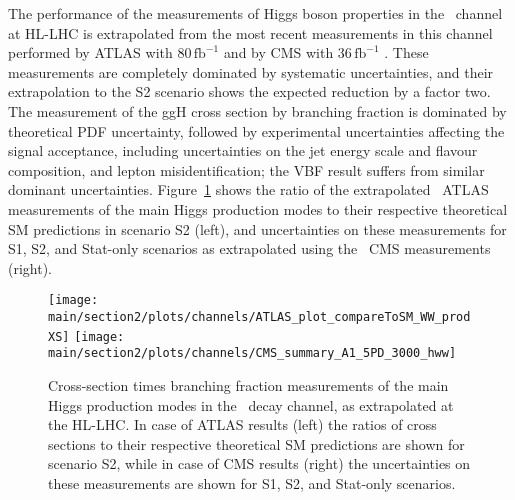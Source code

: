 The performance of the measurements of Higgs boson properties in the \HWW\ channel at HL-LHC is extrapolated from the most recent measurements in this channel performed by ATLAS with 80\,$\mathrm{fb}^{-1}$ \cite{Aaboud:2018jqu} and by CMS with 36\,$\mathrm{fb}^{-1}$ \cite{Sirunyan:2018egh}. These measurements are completely dominated by systematic uncertainties, and their extrapolation to the S2 scenario shows the expected reduction by a factor two. The measurement of the ggH cross section by branching fraction is dominated by theoretical PDF uncertainty, followed by experimental uncertainties affecting the signal acceptance, including uncertainties on the jet energy scale and flavour composition, and lepton misidentification; the VBF result suffers from similar dominant uncertainties.
Figure~\ref{fig:HWW_ATLAS_HLLHC_S2} shows the ratio of the extrapolated \HWW\ ATLAS measurements of the main Higgs production modes to their respective theoretical SM predictions in scenario S2 (left), and uncertainties on these measurements for S1, S2, and Stat-only scenarios as extrapolated using the \HWW\ CMS measurements (right).

\begin{figure}
  \centering
  \texttt{[image: \\main/section2/plots/channels/ATLAS\_plot\_compareToSM\_WW\_prodXS]}
  \texttt{[image: \\main/section2/plots/channels/CMS\_summary\_A1\_5PD\_3000\_hww]}
  \caption{Cross-section times branching fraction measurements of the main Higgs production modes in the \HWW\ decay channel, as extrapolated at the HL-LHC. In case of ATLAS results (left) the ratios of cross sections to their respective theoretical SM predictions are shown for scenario S2, while in case of CMS results (right) the uncertainties on these measurements are shown for S1, S2, and Stat-only scenarios.}
  \label{fig:HWW_ATLAS_HLLHC_S2}
\end{figure}
